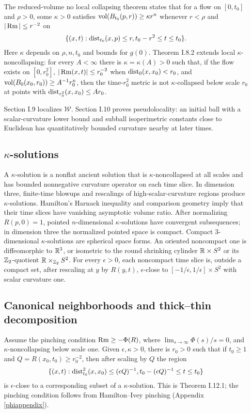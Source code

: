 The reduced-volume no local collapsing theorem states that for a flow on
$[0,t_0]$ and $\rho>0$, some $\kappa>0$ satisfies
$\operatorname{vol}(B_{t_0}(p,r))\geq\kappa r^n$ whenever $r<\rho$ and
$|\operatorname{Rm}|\leq r^{-2}$ on
\[
\{(x,t):\operatorname{dist}_{t_0}(x,p)\leq r, t_0-r^2\leq t\leq t_0\}.
\]
Here $\kappa$ depends on $\rho,n,t_0$ and bounds for $g(0)$.  Theorem
I.8.2 extends local $\kappa$-noncollapsing: for every $A<\infty$ there is
$\kappa=\kappa(A)>0$ such that, if the flow exists on $[0,r_0^2]$,
$|\operatorname{Rm}(x,t)|\leq r_0^{-2}$ when $\operatorname{dist}_0(x,x_0)<r_0$, and
$\operatorname{vol}(B_0(x_0,r_0))\geq A^{-1}r_0^n$, then the time-$r_0^2$ metric is not
$\kappa$-collapsed below scale $r_0$ at points with
$\operatorname{dist}_{r_0^2}(x,x_0)\leq Ar_0$.

Section I.9 localizes ${\mathcal W}$.  Section I.10 proves pseudolocality:
an initial ball with a scalar-curvature lower bound and subball isoperimetric
constants close to Euclidean has quantitatively bounded curvature nearby at
later times.

\subsection{$\kappa$-solutions}

A $\kappa$-solution is a nonflat ancient solution that is
$\kappa$-noncollapsed at all scales and has bounded nonnegative curvature
operator on each time slice.  In dimension three, finite-time blowups and
rescalings of high-scalar-curvature regions produce $\kappa$-solutions.
Hamilton's Harnack inequality and comparison geometry imply that their time
slices have vanishing asymptotic volume ratio.  After normalizing
$R(p,0)=1$, pointed $n$-dimensional $\kappa$-solutions have convergent
subsequences; in dimension three the normalized pointed space is compact.
Compact $3$-dimensional $\kappa$-solutions are spherical space forms.  An
oriented noncompact one is diffeomorphic to ${\mathbb R}^3$, or isometric to the round
shrinking cylinder ${\mathbb R}\times S^2$ or its ${\mathbb Z}_2$-quotient
${\mathbb R}\times_{{\mathbb Z}_2}S^2$.  For every $\epsilon>0$, each noncompact time slice is,
outside a compact set, after rescaling at $y$ by $R(y,t)$,
$\epsilon$-close to
$[-1/\epsilon,1/\epsilon]\times S^2$ with scalar curvature one.

\subsection{Canonical neighborhoods and thick--thin decomposition}

Assume the pinching condition
$\operatorname{Rm}\geq-\Phi(R)$, where
$\lim_{s\rightarrow\infty}\Phi(s)/s=0$, and $\kappa$-noncollapsing below
scale one.  Given $\epsilon,\kappa>0$, there is $r_0>0$ such that if
$t_0\geq1$ and $Q=R(x_0,t_0)\geq r_0^{-2}$, then after scaling by $Q$ the
region
\[
\{(x,t):\operatorname{dist}_{t_0}^2(x,x_0)\leq(\epsilon Q)^{-1},
t_0-(\epsilon Q)^{-1}\leq t\leq t_0\}
\]
is $\epsilon$-close to a corresponding subset of a $\kappa$-solution.  This
is Theorem I.12.1; the pinching condition follows from Hamilton--Ivey
pinching (Appendix \ref{phiappendix}).

